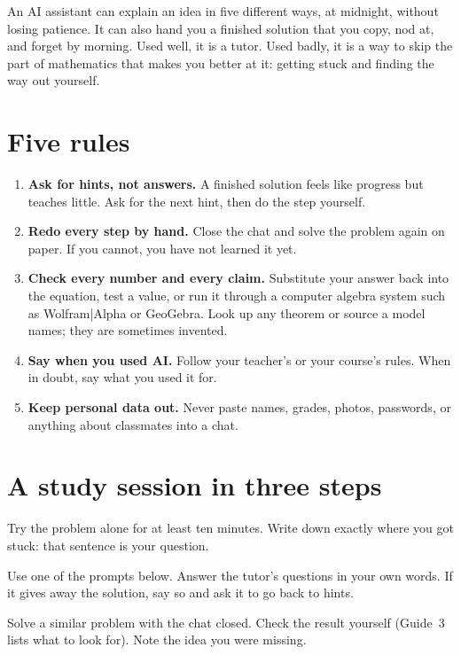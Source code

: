 \documentclass[11pt]{article}
\begin{document}

An AI assistant can explain an idea in five different ways, at midnight, without
losing patience. It can also hand you a finished solution that you copy, nod
at, and forget by morning. Used well, it is a tutor. Used badly, it is a way to
skip the part of mathematics that makes you better at it: getting stuck and
finding the way out yourself.

\section{Five rules}
\begin{enumerate}[label=\textbf{\arabic*.}]
  \item \textbf{Ask for hints, not answers.} A finished solution feels like
    progress but teaches little. Ask for the next hint, then do the step
    yourself.
  \item \textbf{Redo every step by hand.} Close the chat and solve the problem
    again on paper. If you cannot, you have not learned it yet.
  \item \textbf{Check every number and every claim.} Substitute your answer
    back into the equation, test a value, or run it through a computer algebra
    system such as Wolfram|Alpha or GeoGebra. Look up any theorem or source a
    model names; they are sometimes invented.
  \item \textbf{Say when you used AI.} Follow your teacher's or your course's
    rules. When in doubt, say what you used it for.
  \item \textbf{Keep personal data out.} Never paste names, grades, photos,
    passwords, or anything about classmates into a chat.
\end{enumerate}

\section{A study session in three steps}
\begin{description}[leftmargin=0pt,labelsep=0.4em]
  \item[Before.] Try the problem alone for at least ten minutes. Write down
    exactly where you got stuck: that sentence is your question.
  \item[During.] Use one of the prompts below. Answer the tutor's questions
    in your own words. If it gives away the solution, say so and ask it to go
    back to hints.
  \item[After.] Solve a similar problem with the chat closed. Check the result
    yourself (Guide~3 lists what to look for). Note the idea you were missing.
\end{description}
\end{document}

